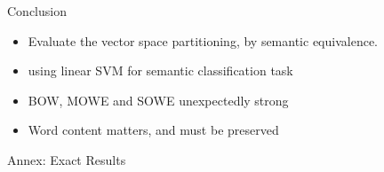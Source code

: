 \documentclass[12pt,landscape,english]{beamer}
\begin{document}
\begin{frame}[fragile]{Conclusion}
	\begin{comment}
	\begin{tikzpicture}
		\begin{axis}[resplot, 
		ytick={0,50,100}, 
		height= 3cm, width=0.9\textwidth, 
		legend pos = outer north east,
		legend style={font = \tiny}
		]
			\addplot[fill=uwayellow] table [y=MSRP,x expr=\coordindex] {\resultstable};
			\addplot [fill=uwablue] table [y=Opiniosis,x expr=\coordindex]{\resultstable};
			\legend{MSRP, Opinosis};
		\end{axis}
	\end{tikzpicture}
	\end{comment}
	
	\begin{itemize}
	\item Evaluate the vector space partitioning, by semantic equivalence.
	\item using linear SVM for semantic classification task
	\item BOW, MOWE and SOWE unexpectedly strong
	\item Word content matters, and must be preserved
	\end{itemize}
\end{frame}


\begin{frame}{Annex: Exact Results}
	\centering\pgfplotstabletypeset[columns={Name, MSRP, Opiniosis}, 
		every head row/.style={before row=\toprule,after row=\midrule},
		columns/Name/.style={string type},
		skip rows between index={7}{10}]\resultstable
\end{frame}
\end{document}
